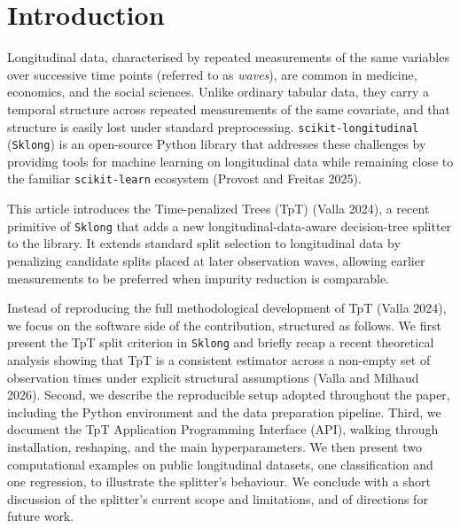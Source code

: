 \documentclass[
]{article}
\author{}
\date{}
\begin{document}
\section{Introduction}\label{introduction}

Longitudinal data, characterised by repeated measurements of the same
variables over successive time points (referred to as \emph{waves}), are
common in medicine, economics, and the social sciences. Unlike ordinary
tabular data, they carry a temporal structure across repeated
measurements of the same covariate, and that structure is easily lost
under standard preprocessing. \texttt{scikit-longitudinal}
(\texttt{Sklong}) is an open-source Python library that addresses these
challenges by providing tools for machine learning on longitudinal data
while remaining close to the familiar \texttt{scikit-learn} ecosystem
(Provost and Freitas 2025).

This article introduces the Time-penalized Trees (TpT) (Valla 2024), a
recent primitive of \texttt{Sklong} that adds a new
longitudinal-data-aware decision-tree splitter to the library. It
extends standard split selection to longitudinal data by penalizing
candidate splits placed at later observation waves, allowing earlier
measurements to be preferred when impurity reduction is comparable.

Instead of reproducing the full methodological development of TpT (Valla
2024), we focus on the software side of the contribution, structured as
follows. We first present the TpT split criterion in \texttt{Sklong} and
briefly recap a recent theoretical analysis showing that TpT is a
consistent estimator across a non-empty set of observation times under
explicit structural assumptions (Valla and Milhaud 2026). Second, we
describe the reproducible setup adopted throughout the paper, including
the Python environment and the data preparation pipeline. Third, we
document the TpT Application Programming Interface (API), walking
through installation, reshaping, and the main hyperparameters. We then
present two computational examples on public longitudinal datasets, one
classification and one regression, to illustrate the splitter's
behaviour. We conclude with a short discussion of the splitter's current
scope and limitations, and of directions for future work.
\end{document}
